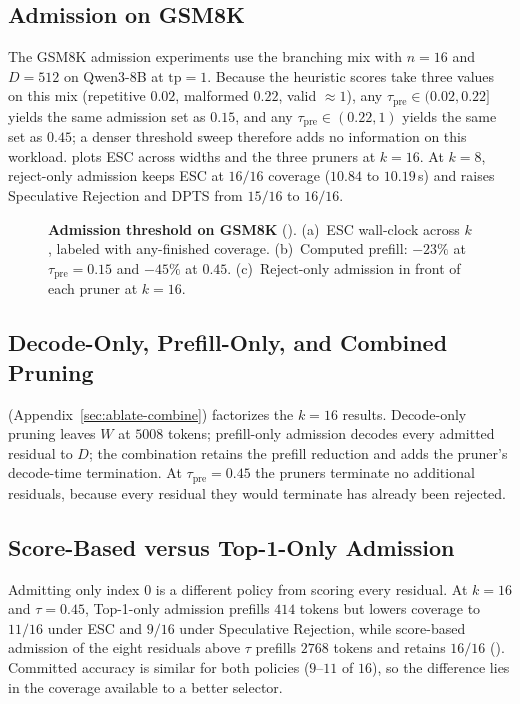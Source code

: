 \subsection{Admission on GSM8K}
\label{sec:eval-prefill}

The GSM8K admission experiments use the branching mix with $n{=}16$ and $D{=}512$ on Qwen3-8B at $\mathrm{tp}{=}1$.
Because the heuristic scores take three values on this mix (repetitive $0.02$, malformed $0.22$, valid $\approx1$), any $\tau_{\mathrm{pre}}\in(0.02,0.22]$ yields the same admission set as $0.15$, and any $\tau_{\mathrm{pre}}\in(0.22,1)$ yields the same set as $0.45$; a denser threshold sweep therefore adds no information on this workload.
 plots ESC across widths and the three pruners at $k{=}16$.
At $k{=}8$, reject-only admission keeps ESC at $16/16$ coverage ($10.84$ to $10.19$\,s) and raises Speculative Rejection and DPTS from $15/16$ to $16/16$.

\begin{figure}[t]
\centering
\resizebox{\textwidth}{!}{}
\caption{\textbf{Admission threshold on GSM8K} ().
(a)~ESC wall-clock across $k$, labeled with any-finished coverage.
(b)~Computed prefill: $-23\%$ at $\tau_{\mathrm{pre}}{=}0.15$ and $-45\%$ at $0.45$.
(c)~Reject-only admission in front of each pruner at $k{=}16$.}
\label{fig:eval-admit}
\end{figure}

\subsection{Decode-Only, Prefill-Only, and Combined Pruning}
\label{sec:eval-ablate}

 (Appendix~\ref{sec:ablate-combine}) factorizes the $k{=}16$ results.
Decode-only pruning leaves $W$ at $5008$ tokens; prefill-only admission decodes every admitted residual to $D$; the combination retains the prefill reduction and adds the pruner's decode-time termination.
At $\tau_{\mathrm{pre}}{=}0.45$ the pruners terminate no additional residuals, because every residual they would terminate has already been rejected.

\subsection{Score-Based versus Top-1-Only Admission}
\label{sec:eval-wide}

Admitting only index $0$ is a different policy from scoring every residual.
At $k{=}16$ and $\tau{=}0.45$, Top-1-only admission prefills $414$ tokens but lowers coverage to $11/16$ under ESC and $9/16$ under Speculative Rejection, while score-based admission of the eight residuals above $\tau$ prefills $2768$ tokens and retains $16/16$ ().
Committed accuracy is similar for both policies ($9$--$11$ of $16$), so the difference lies in the coverage available to a better selector.

